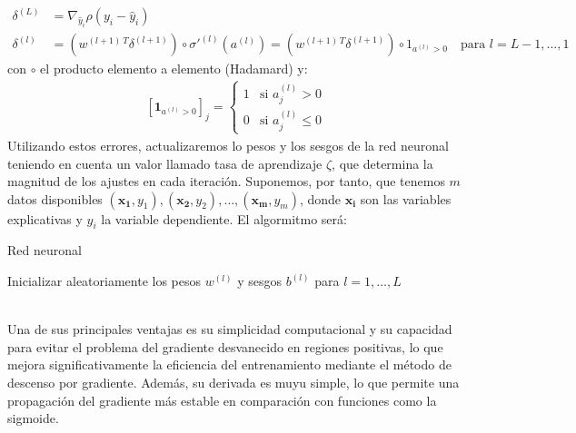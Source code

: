 \documentclass[11pt]{book}
\theoremstyle{plain} %
\theoremstyle{definition} %
\begin{document}
\begin{align*}
   \delta^{(L)} &= \nabla_{\hat{y}_i} \rho(y_i - \hat{y}_i)\\
   \delta^{(l)} &= \left( w^{(l+1) \, T} \delta^{(l+1)} \right) \circ \sigma'^{(l)}(a^{(l)}) = \left( w^{(l+1)\, T} \delta^{(l+1)} \right) \circ 1_{a^{(l)} > 0}\quad \text{para } l = L-1, \dots, 1
\end{align*}
con $\circ$ el producto elemento a elemento (Hadamard) y:
\begin{align*}
    \left[\mathbf{1}_{a^{(l)} > 0}\right]_j =
    \begin{cases}
        1 & \text{si } a_j^{(l)} > 0 \\
        0 & \text{si } a_j^{(l)} \leq 0
    \end{cases}
\end{align*}
Utilizando estos errores, actualizaremos lo pesos y los sesgos de la red neuronal teniendo 
en cuenta un valor llamado tasa de aprendizaje $\zeta$, que determina la magnitud de los
ajustes en cada iteración. Suponemos, por tanto, que tenemos $m$ datos disponibles 
$(\mathbf{x_1}, y_1), (\mathbf{x_2}, y_2), \dots, (\mathbf{x_m}, y_m)$, donde $\mathbf{x_i}$ 
son las variables explicativas y $y_i$ la variable dependiente. El algormitmo será:\\

\begin{algorithm}[H]
   \caption{Red neuronal}
   Inicializar aleatoriamente los pesos $w^{(l)}$ y sesgos $b^{(l)}$ para $l = 1, \dots, L$\;
   \end{algorithm}
\hfil\\
Una de sus principales ventajas es su simplicidad computacional y su capacidad para 
evitar el problema del gradiente desvanecido en regiones positivas, lo que mejora 
significativamente la eficiencia del entrenamiento mediante el método de descenso por 
gradiente. Además, su derivada es muyu simple, lo que  permite una propagación del 
gradiente más estable en comparación con funciones como la sigmoide. \\
\end{document}
